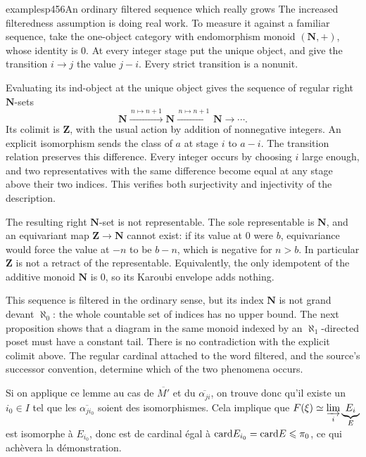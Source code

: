 \begin{dcomment}{examples}{p456}{An ordinary filtered sequence which really grows}
The increased filteredness assumption is doing real work. To measure it against a familiar sequence, take the one-object category with endomorphism monoid $(\mathbf N,+)$, whose identity is $0$. At every integer stage put the unique object, and give the transition $i\to j$ the value $j-i$. Every strict transition is a nonunit.

Evaluating its ind-object at the unique object gives the sequence of regular right $\mathbf N$-sets
\[
\mathbf N\xrightarrow{\,n\mapsto n+1\,}\mathbf N
\xrightarrow{\,n\mapsto n+1\,}\mathbf N\longrightarrow\cdots .
\]
Its colimit is $\mathbf Z$, with the usual action by addition of nonnegative integers. An explicit isomorphism sends the class of $a$ at stage $i$ to $a-i$. The transition relation preserves this difference. Every integer occurs by choosing $i$ large enough, and two representatives with the same difference become equal at any stage above their two indices. This verifies both surjectivity and injectivity of the description.

The resulting right $\mathbf N$-set is not representable. The sole representable is $\mathbf N$, and an equivariant map $\mathbf Z\to\mathbf N$ cannot exist: if its value at $0$ were $b$, equivariance would force the value at $-n$ to be $b-n$, which is negative for $n>b$. In particular $\mathbf Z$ is not a retract of the representable. Equivalently, the only idempotent of the additive monoid $\mathbf N$ is $0$, so its Karoubi envelope adds nothing.

This sequence is filtered in the ordinary sense, but its index $\mathbf N$ is not grand devant $\aleph_0$: the whole countable set of indices has no upper bound. The next proposition shows that a diagram in the same monoid indexed by an $\aleph_1$-directed poset must have a constant tail. There is no contradiction with the explicit colimit above. The regular cardinal attached to the word filtered, and the source's successor convention, determine which of the two phenomena occurs.
\end{dcomment}


Si on applique ce lemme au cas de $\overline{M'}$ et du $\overline{\alpha_{ji}}$, on trouve donc qu'il existe un $i_0 \in I$ tel que les $\overline{\alpha_{ji_0}}$ soient des isomorphismes. Cela implique que $F(\xi) \simeq \varinjlim\limits_{i} \underbrace{E_i}_{E}$ est isomorphe à $E_{i_0}$, donc est de cardinal égal à $\mathrm{card} E_{i_0} = \mathrm{card} E \leqslant \pi_0$, ce qui achèvera la démonstration.

